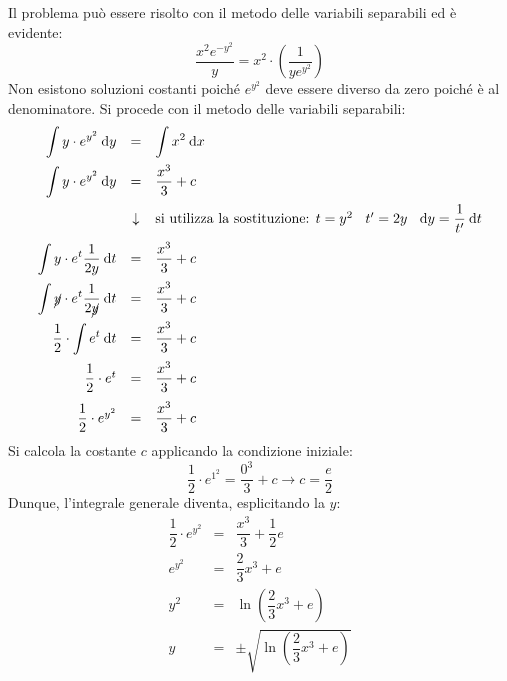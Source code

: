 \documentclass[a4paper]{article}
\begin{document}
	\noindent
	Il problema può essere risolto con il metodo delle variabili separabili ed è evidente:
	\begin{equation*}
		\dfrac{x^{2} e^{-y^{2}}}{y} = x^{2} \cdot \left(\dfrac{1}{y e^{y^{2}}}\right)
	\end{equation*}
	Non esistono soluzioni costanti poiché $e^{y^{2}}$ deve essere diverso da zero poiché è al denominatore. Si procede con il metodo delle variabili separabili:
	\begin{equation*}
		\begin{array}{rcl}
			\displaystyle\int y \cdot e^{y^{2}} \: \mathrm{d}y &=& \displaystyle\int x^{2} \:\mathrm{d}x \\ [1em]
			\displaystyle\int y \cdot e^{y^{2}} \: \mathrm{d}y &=& \dfrac{x^{3}}{3} + c \\ [1em]
			&\downarrow& \text{si utilizza la sostituzione: } t = y^{2} \:\:\:\: t'=2y \:\:\:\: \mathrm{d}y = \dfrac{1}{t'}\:\mathrm{d}t \\ [1em]
			\displaystyle\int y \cdot e^{t} \dfrac{1}{2y} \:\mathrm{d}t &=& \dfrac{x^{3}}{3} + c \\ [1em]
			\displaystyle\int \cancel{y} \cdot e^{t} \dfrac{1}{2\cancel{y}} \:\mathrm{d}t &=& \dfrac{x^{3}}{3} + c \\ [1em]
			\dfrac{1}{2} \cdot \displaystyle\int e^{t} \:\mathrm{d}t &=& \dfrac{x^{3}}{3} + c \\ [1em]
			\dfrac{1}{2} \cdot e^{t} &=& \dfrac{x^{3}}{3} + c \\ [1em]
			\dfrac{1}{2} \cdot e^{y^{2}} &=& \dfrac{x^{3}}{3} + c
		\end{array}
	\end{equation*}
	Si calcola la costante $c$ applicando la condizione iniziale:
	\begin{equation*}
		\dfrac{1}{2} \cdot e^{1^{2}} = \dfrac{0^{3}}{3} + c \rightarrow c = \dfrac{e}{2}
	\end{equation*}
	Dunque, l'integrale generale diventa, esplicitando la $y$:
	\begin{equation*}
		\begin{array}{rcl}
			\dfrac{1}{2} \cdot e^{y^{2}} &=& \dfrac{x^{3}}{3} + \dfrac{1}{2}e \\ [1em]
			e^{y^{2}} &=& \dfrac{2}{3}x^{3} + e \\ [1em]
			y^{2} &=& \ln\left(\dfrac{2}{3}x^{3} + e\right) \\ [1em]
			y &=& \pm\sqrt{\ln\left(\dfrac{2}{3}x^{3} + e\right)}
		\end{array}
	\end{equation*}
\end{document}
